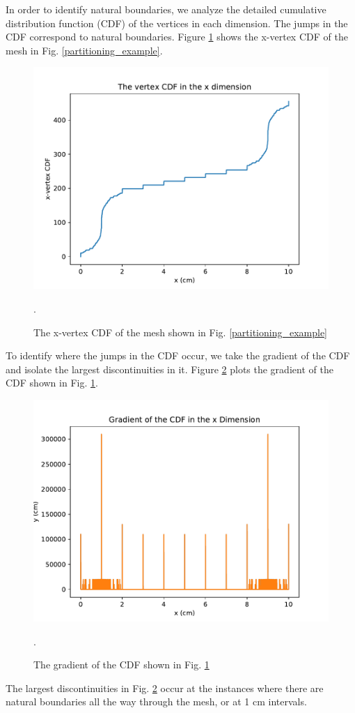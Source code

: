 In order to identify natural boundaries, we analyze the detailed cumulative distribution function (CDF) of the vertices in each dimension. The jumps in the CDF correspond to natural boundaries. Figure \ref{vert_cdf} shows the x-vertex CDF of the mesh in Fig. \ref{partitioning_example}. 
\begin{figure}[h]
\centering
\includegraphics[scale=0.75]{../figures/xvertexcdf.pdf}
\caption{The x-vertex CDF of the mesh shown in Fig. \ref{partitioning_example}}.
\label{vert_cdf}
\end{figure}

To identify where the jumps in the CDF occur, we take the gradient of the CDF and isolate the largest discontinuities in it. Figure \ref{gradcdf} plots the gradient of the CDF shown in Fig. \ref{vert_cdf}.
\begin{figure}[h]
\centering
\includegraphics[scale=0.75]{../figures/gradcdf.pdf}
\caption{The gradient of the CDF shown in Fig. \ref{vert_cdf}}.
\label{gradcdf}
\end{figure}
The largest discontinuities in Fig. \ref{gradcdf} occur at the instances where there are natural boundaries all the way through the mesh, or at 1 cm intervals. 


